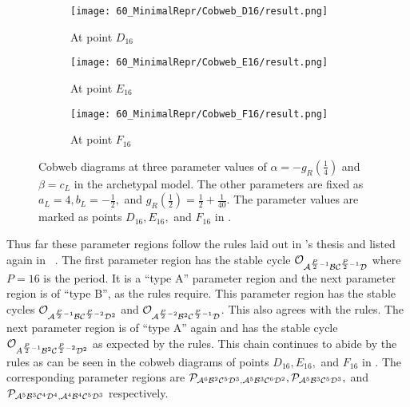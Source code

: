 \begin{figure}
	\centering
	\begin{subfigure}{0.3\textwidth}
		\centering
		\texttt{[image: 60\_MinimalRepr/Cobweb\_D16/result.png]}
		\caption{At point $D_{16}$}
		\label{fig:archdyn.dyn.cobweb.D}
	\end{subfigure}
	\begin{subfigure}{0.3\textwidth}
		\centering
		\texttt{[image: 60\_MinimalRepr/Cobweb\_E16/result.png]}
		\caption{At point $E_{16}$}
		\label{fig:archdyn.dyn.cobweb.E}
	\end{subfigure}
	\begin{subfigure}{0.3\textwidth}
		\centering
		\texttt{[image: 60\_MinimalRepr/Cobweb\_F16/result.png]}
		\caption{At point $F_{16}$}
		\label{fig:archdyn.dyn.cobweb.F}
	\end{subfigure}
	\caption[Cobweb diagrams of the archetypal model]{
		Cobweb diagrams at three parameter values of $\alpha = -g_R\left(\frac{1}{4}\right)$ and $\beta = c_L$ in the archetypal model.
		The other parameters are fixed as $a_L = 4, b_L = -\frac{1}{2},$ and $g_R\left(\frac{1}{2}\right) = \frac{1}{2} + \frac{1}{40}$.
		The parameter values are marked as points $D_{16}, E_{16},$ and $F_{16}$ in .
	}
	\label{fig:archdyn.dyn.cobwebs.2}
\end{figure}

Thus far these parameter regions follow the rules laid out in 's thesis and listed again in ~\Cite{akyuz2022}.
The first parameter region has the stable cycle $\mathcal{O}_{\mathcal{A}^{\frac{P}{2} - 1}\mathcal{B}\mathcal{C}^{\frac{P}{2} - 1}\mathcal{D}}$ where $P = 16$ is the period.
It is a ``type A'' parameter region and the next parameter region is of ``type B'', as the rules require.
This parameter region has the stable cycles $\mathcal{O}_{\mathcal{A}^{\frac{P}{2} - 1}\mathcal{B}\mathcal{C}^{\frac{P}{2} - 2}\mathcal{D}^2}$ and $\mathcal{O}_{\mathcal{A}^{\frac{P}{2} - 2}\mathcal{B}^2\mathcal{C}^{\frac{P}{2} - 1}\mathcal{D}}$.
This also agrees with the rules.
The next parameter region is of ``type A'' again and has the stable cycle $\mathcal{O}_{A^{\frac{P}{2} - 1}\mathcal{B}^2\mathcal{C}^{\frac{P}{2} - 2}\mathcal{D}^2}$ as expected by the rules.
This chain continues to abide by the rules as can be seen in the cobweb diagrams of points $D_{16}, E_{16},$ and $F_{16}$ in .
The corresponding parameter regions are $\mathcal{P}_{\mathcal{A}^6\mathcal{B}^2\mathcal{C}^5\mathcal{D}^3, \mathcal{A}^5\mathcal{B}^3\mathcal{C}^6\mathcal{D}^2}, \mathcal{P}_{\mathcal{A}^5\mathcal{B}^3\mathcal{C}^5\mathcal{D}^3},$ and $\mathcal{P}_{\mathcal{A}^5\mathcal{B}^3\mathcal{C}^4\mathcal{D}^4, \mathcal{A}^4\mathcal{B}^4\mathcal{C}^5\mathcal{D}^3}$ respectively.

